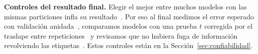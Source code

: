 \textbf{Controles del resultado final.} Elegir el mejor entre muchos modelos con las mismas particiones infla su
resultado~\cite{cawley2010}. Por eso al final medimos el error esperado con validación anidada~\cite{varma2006},
comparamos modelos con una prueba $t$ corregida por el traslape entre repeticiones~\cite{nadeau2003} y revisamos que
no hubiera fuga de información revolviendo las etiquetas~\cite{kaufman2012}. Estos controles están en la
Sección~\ref{sec:confiabilidad}.
